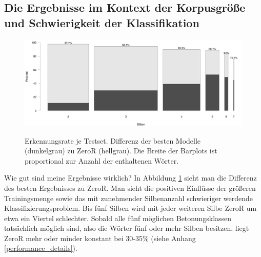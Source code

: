 \subsection{Die Ergebnisse im Kontext der Korpusgröße und Schwierigkeit der Klassifikation}
\begin{figure}[hb]
    \centering
    \caption{Erkennungsrate je Testset. Differenz der besten Modelle (dunkelgrau) zu ZeroR (hellgrau). Die Breite der Barplots ist proportional zur Anzahl der enthaltenen Wörter.}
    \includegraphics[width=.75\columnwidth]{figures/performance_by_syllables.png}
    \label{figure:results_proportional}
\end{figure}

Wie gut sind meine Ergebnisse wirklich? In Abbildung \ref{figure:results_proportional} sieht man die Differenz des besten Ergebnisses zu ZeroR. Man sieht die positiven Einflüsse der größeren Trainingsmenge sowie das mit zunehmender Silbenanzahl schwieriger werdende Klassifizierungsproblem. Bis fünf Silben wird mit jeder weiteren Silbe ZeroR um etwa ein Viertel schlechter. Sobald alle fünf möglichen Betonungsklassen tatsächlich möglich sind, also die Wörter fünf oder mehr Silben besitzen, liegt ZeroR mehr oder minder konstant bei 30-35\% (siehe Anhang \ref{performance_details}).

